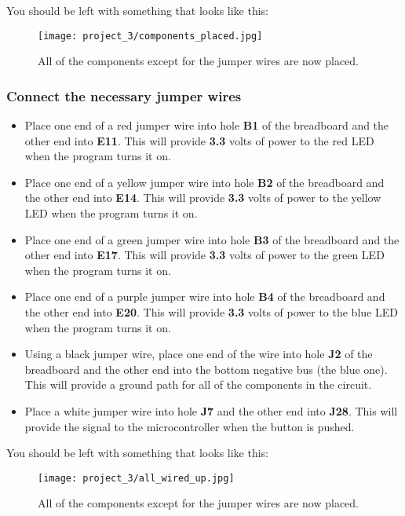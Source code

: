 You should be left with something that looks like this:
\begin{figure}[H]
    \centering
    \texttt{[image: project\_3/components\_placed.jpg]}
    \caption{All of the components except for the jumper wires are now placed.}
\end{figure}

\subsubsection{Connect the necessary jumper wires}
\begin{itemize}
    \item Place one end of a red jumper wire into hole \textbf{B1} of the breadboard and the other end into
    \textbf{E11}. This will provide \textbf{3.3} volts of power to the red LED when the program turns it on.
    \item Place one end of a yellow jumper wire into hole \textbf{B2} of the breadboard and the other end into
    \textbf{E14}. This will provide \textbf{3.3} volts of power to the yellow LED when the program turns it on.
    \item Place one end of a green jumper wire into hole \textbf{B3} of the breadboard and the other end into
    \textbf{E17}. This will provide \textbf{3.3} volts of power to the green LED when the program turns it on.
    \item Place one end of a purple jumper wire into hole \textbf{B4} of the breadboard and the other end into
    \textbf{E20}. This will provide \textbf{3.3} volts of power to the blue LED when the program turns it on.
    \item Using a black jumper wire, place one end of the wire into hole \textbf{J2} of the breadboard and the other
    end into the bottom negative bus (the blue one). This will provide a ground path for all of the components
    in the circuit.
    \item Place a white jumper wire into hole \textbf{J7} and the other end into \textbf{J28}. This will
    provide the signal to the microcontroller when the button is pushed.
\end{itemize}

You should be left with something that looks like this:
\begin{figure}[H]
    \centering
    \texttt{[image: project\_3/all\_wired\_up.jpg]}
    \caption{All of the components except for the jumper wires are now placed.}
\end{figure}

